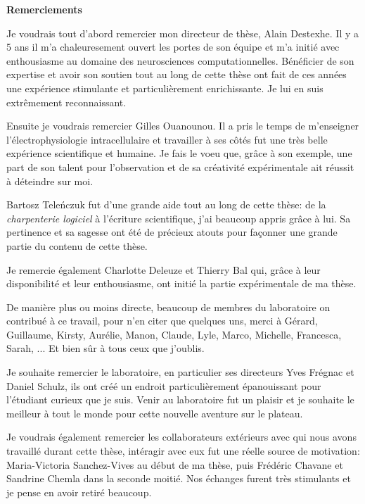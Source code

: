 \documentclass[11pt]{book}
\title{}
\date{}
\author{}
\begin{document}
\thispagestyle{empty}

\huge \textbf{Remerciements} \normalsize
\vspace*{.5cm}

Je voudrais tout d'abord remercier mon directeur de thèse, Alain
Destexhe. Il y a 5 ans il m'a chaleuresement ouvert les portes de son
équipe et m'a initié avec enthousiasme au domaine des neurosciences
computationnelles. Bénéficier de son expertise et avoir son soutien
tout au long de cette thèse ont fait de ces années une expérience
stimulante et particulièrement enrichissante. Je lui en suis
extrêmement reconnaissant.

Ensuite je voudrais remercier Gilles Ouanounou. Il a pris le temps de
m'enseigner l'électrophysiologie intracellulaire et travailler à ses
côtés fut une très belle expérience scientifique et humaine. Je fais
le voeu que, grâce à son exemple, une part de son talent pour
l'observation et de sa créativité expérimentale ait réussit à
déteindre sur moi.

Bartosz Teleńczuk fut d'une grande aide tout au long de cette thèse:
de la \textit{charpenterie logiciel} à l'écriture scientifique, j'ai
beaucoup appris grâce à lui. Sa pertinence et sa sagesse ont été de
précieux atouts pour façonner une grande partie du contenu de cette
thèse.

Je remercie également Charlotte Deleuze et Thierry Bal qui, grâce à
leur disponibilité et leur enthousiasme, ont initié la partie
expérimentale de ma thèse. 

De manière plus ou moins directe, beaucoup de membres du laboratoire
on contribué à ce travail, pour n'en citer que quelques uns, merci à
Gérard, Guillaume, Kirsty, Aurélie, Manon, Claude, Lyle, Marco,
Michelle, Francesca, Sarah, ... Et bien sûr à tous ceux que j'oublis.

Je souhaite remercier le laboratoire, en particulier ses directeurs
Yves Frégnac et Daniel Schulz, ils ont créé un endroit
particulièrement épanouissant pour l'étudiant curieux que je
suis. Venir au laboratoire fut un plaisir et je souhaite le meilleur à
tout le monde pour cette nouvelle aventure sur le plateau.

Je voudrais également remercier les collaborateurs extérieurs avec qui
nous avons travaillé durant cette thèse, intéragir avec eux fut une
réelle source de motivation: Maria-Victoria Sanchez-Vives au début de
ma thèse, puis Frédéric Chavane et Sandrine Chemla dans la seconde
moitié. Nos échanges furent très stimulants et je pense en avoir
retiré beaucoup.
\end{document}
